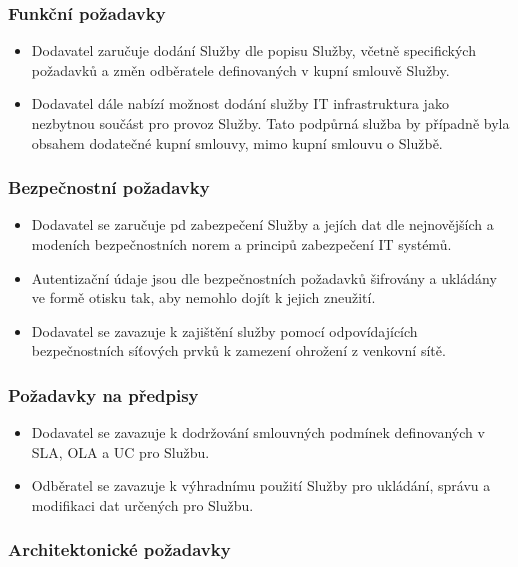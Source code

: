 \documentclass[11pt, a4paper, titlepage]{article}
\begin{document}
	\subsubsection*{Funkční požadavky}

	\begin{itemize}
		\item Dodavatel zaručuje dodání Služby dle popisu Služby, včetně specifických požadavků a změn odběratele definovaných v kupní smlouvě Služby.
		\item Dodavatel dále nabízí možnost dodání služby IT infrastruktura jako nezbytnou součást pro provoz Služby. Tato podpůrná služba by případně byla obsahem dodatečné kupní smlouvy, mimo kupní smlouvu o Službě.  
	\end{itemize}

	\subsubsection*{Bezpečnostní požadavky}

	\begin{itemize}
		\item Dodavatel se zaručuje pd zabezpečení Služby a jejích dat dle nejnovějších a modeních bezpečnostních norem a principů zabezpečení IT systémů.
		\item Autentizační údaje jsou dle bezpečnostních požadavků šifrovány a ukládány ve formě otisku tak, aby nemohlo dojít k jejich zneužití.
		\item Dodavatel se zavazuje k zajištění služby pomocí odpovídajících bezpečnostních síťových prvků k zamezení ohrožení z venkovní sítě. 
	\end{itemize}

	\subsubsection*{Požadavky na předpisy}

	\begin{itemize}
		\item Dodavatel se zavazuje k dodržování smlouvných podmínek definovaných v SLA, OLA a UC pro Službu.
		\item Odběratel se zavazuje k výhradnímu použití Služby pro ukládání, správu a modifikaci dat určených pro Službu.
	\end{itemize}

	\subsubsection*{Architektonické požadavky}
\end{document}
